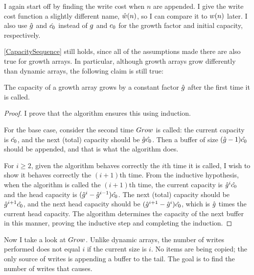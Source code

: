 \HdrGrowthArrayImpl

\HdrTimeComplex

I again start off by finding the write cost when $n$ are appended. I give the write cost function a slightly different name, $\hat{w}(n)$, so I can compare it to $w(n)$ later. I also use $\hat{g}$ and $\hat{c_0}$ instead of $g$ and $c_0$ for the growth factor and initial capacity, respectively.

\ref{CapacitySequence} still holds, since all of the assumptions made there are also true for growth arrays. In particular, although growth arrays grow differently than dynamic arrays, the following claim is still true:

\begin{lemma}
	The capacity of a growth array grows by a constant factor $\hat{g}$ after the first time it is called.
\end{lemma}

\begin{proof}
	I prove that the algorithm ensures this using induction.
	
	For the base case, consider the second time $Grow$ is called: the current capacity is $\hat{c_0}$, and the next (total) capacity should be $\hat{g}\hat{c_0}$. Then a buffer of size $(\hat{g} - 1)\hat{c_0}$ should be appended, and that is what the algorithm does.
	
	For $i \geq 2$, given the algorithm behaves correctly the $i$th time it is called, I wish to show it behaves correctly the $(i + 1)$th time. From the inductive hypothesis, when the algorithm is called the $(i + 1)$th time, the current capacity is $\hat{g}^i\hat{c_0}$ and the head capacity is $(\hat{g}^i - \hat{g}^{i - 1})\hat{c_0}$. The next (total) capacity should be $\hat{g}^{i + 1}\hat{c_0}$, and the next head capacity should be $(\hat{g}^{i + 1} - \hat{g}^i)\hat{c_0}$, which is $\hat{g}$ times the current head capacity. The algorithm determines the capacity of the next buffer in this manner, proving the inductive step and completing the induction.
\end{proof}

Now I take a look at $Grow$. Unlike dynamic arrays, the number of writes performed does not equal $i$ if the current size is $i$. No items are being copied; the only source of writes is appending a buffer to the tail. The goal is to find the number of writes that causes.

